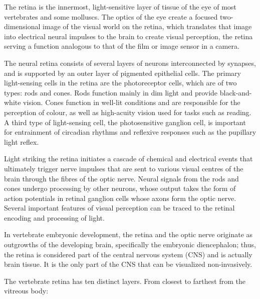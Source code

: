 \documentclass[]{book}
\begin{document}
The retina is the innermost, light-sensitive layer of tissue of the eye of most vertebrates and some molluscs. The optics of the eye create a focused two-dimensional image of the visual world on the retina, which translates that image into electrical neural impulses to the brain to create visual perception, the retina serving a function analogous to that of the film or image sensor in a camera.

The neural retina consists of several layers of neurons interconnected by synapses, and is supported by an outer layer of pigmented epithelial cells. The primary light-sensing cells in the retina are the photoreceptor cells, which are of two types: rods and cones. Rods function mainly in dim light and provide black-and-white vision. Cones function in well-lit conditions and are responsible for the perception of colour, as well as high-acuity vision used for tasks such as reading. A third type of light-sensing cell, the photosensitive ganglion cell, is important for entrainment of circadian rhythms and reflexive responses such as the pupillary light reflex.

Light striking the retina initiates a cascade of chemical and electrical events that ultimately trigger nerve impulses that are sent to various visual centres of the brain through the fibres of the optic nerve. Neural signals from the rods and cones undergo processing by other neurons, whose output takes the form of action potentials in retinal ganglion cells whose axons form the optic nerve. Several important features of visual perception can be traced to the retinal encoding and processing of light.

In vertebrate embryonic development, the retina and the optic nerve originate as outgrowths of the developing brain, specifically the embryonic diencephalon; thus, the retina is considered part of the central nervous system (CNS) and is actually brain tissue. It is the only part of the CNS that can be visualized non-invasively.

The vertebrate retina has ten distinct layers. From closest to farthest from the vitreous body:
\end{document}
